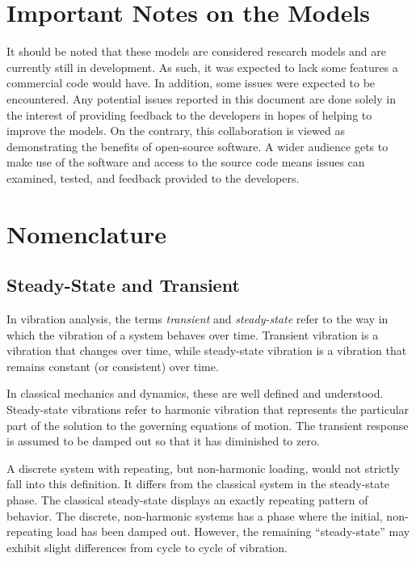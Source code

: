\section{Important Notes on the Models}
It should be noted that these models are considered research models and are currently still in development.  As such, it was expected to lack some features a commercial code would have.  In addition, some issues were expected to be encountered.  Any potential issues reported in this document are done solely in the interest of providing feedback to the developers in hopes of helping to improve the models.    On the contrary, this collaboration is viewed as demonstrating the benefits of open-source software.  A wider audience gets to make use of the software and access to the source code means issues can examined, tested, and feedback provided to the developers.


\section{Nomenclature}
\subsection{Steady-State and Transient}
In vibration analysis, the terms \emph{transient} and \emph{steady-state} refer to the way in which the vibration of a system behaves over time.  Transient vibration is a vibration that changes over time, while steady-state vibration is a vibration that remains constant (or consistent) over time.

In classical mechanics and dynamics, these are well defined and understood.  Steady-state vibrations refer to harmonic vibration that represents the particular part of the solution to the governing equations of motion.  The transient response is assumed to be damped out so that it has diminished to zero.

A discrete system with repeating, but non-harmonic loading, would not strictly fall into this definition.  It differs from the classical system in the steady-state phase.  The classical steady-state displays an exactly repeating pattern of behavior.  The discrete, non-harmonic systems has a phase where the initial, non-repeating load has been damped out.  However, the remaining ``steady-state'' may exhibit slight differences from cycle to cycle of vibration.

